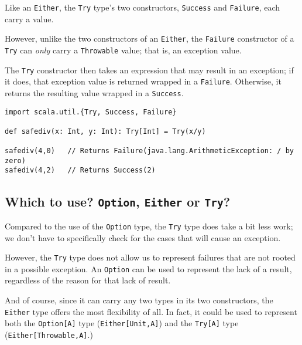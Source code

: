 \documentclass[11pt]{article}
\begin{document}
Like an \texttt{Either}, the \texttt{Try} type's two constructors, \texttt{Success} and \texttt{Failure},
each carry a value.

However, unlike the two constructors of an \texttt{Either},
the \texttt{Failure} constructor of a \texttt{Try} can \emph{only} carry a \texttt{Throwable} value;
that is, an exception value.

The \texttt{Try} constructor then takes an expression that
may result in an exception; if it does, that exception value
is returned wrapped in a \texttt{Failure}. Otherwise, it returns
the resulting value wrapped in a \texttt{Success}.
\begin{verbatim}
import scala.util.{Try, Success, Failure}

def safediv(x: Int, y: Int): Try[Int] = Try(x/y)

safediv(4,0)   // Returns Failure(java.lang.ArithmeticException: / by zero)
safediv(4,2)   // Returns Success(2)
\end{verbatim}

\subsection{Which to use? \texttt{Option}, \texttt{Either} or \texttt{Try}?}
\label{sec:org568ba4f}
Compared to the use of the \texttt{Option} type,
the \texttt{Try} type does take a bit less work;
we don't have to specifically check for the cases that
will cause an exception.

However, the \texttt{Try} type does not allow us to represent failures
that are not rooted in a possible exception.
An \texttt{Option} can be used to represent the lack of a result,
regardless of the reason for that lack of result.

And of course, since it can carry any two types in its two constructors,
the \texttt{Either} type offers the most flexibility of all.
In fact, it could be used to represent both the \texttt{Option[A]} type
(\texttt{Either[Unit,A]}) and the \texttt{Try[A]} type (\texttt{Either[Throwable,A]}.)
\end{document}
